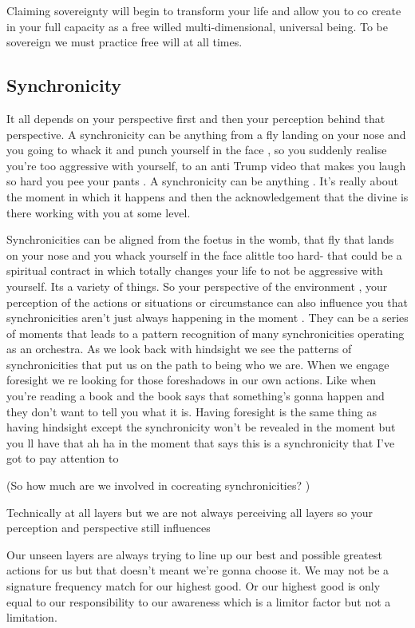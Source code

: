 Claiming sovereignty will begin to transform your life and allow you to
co create in your full capacity as a free willed multi-dimensional,
universal being. To be sovereign we must practice free will at all
times.

\subsection{Synchronicity}\label{synchronicity}

It all depends on your perspective first and then your perception behind
that perspective. A synchronicity can be anything from a fly landing on
your nose and you going to whack it and punch yourself in the face , so
you suddenly realise you're too aggressive with yourself, to an anti
Trump video that makes you laugh so hard you pee your pants . A
synchronicity can be anything . It's really about the moment in which it
happens and then the acknowledgement that the divine is there working
with you at some level.

Synchronicities can be aligned from the foetus in the womb, that fly
that lands on your nose and you whack yourself in the face alittle too
hard- that could be a spiritual contract in which totally changes your
life to not be aggressive with yourself. Its a variety of things. So
your perspective of the environment , your perception of the actions or
situations or circumstance can also influence you that synchronicities
aren't just always happening in the moment . They can be a series of
moments that leads to a pattern recognition of many synchronicities
operating as an orchestra. As we look back with hindsight we see the
patterns of synchronicities that put us on the path to being who we are.
When we engage foresight we re looking for those foreshadows in our own
actions. Like when you're reading a book and the book says that
something's gonna happen and they don't want to tell you what it is.
Having foresight is the same thing as having hindsight except the
synchronicity won't be revealed in the moment but you ll have that ah ha
in the moment that says this is a synchronicity that I've got to pay
attention to

(So how much are we involved in cocreating synchronicities? )

Technically at all layers but we are not always perceiving all layers so
your perception and perspective still influences

Our unseen layers are always trying to line up our best and possible
greatest actions for us but that doesn't meant we're gonna choose it. We
may not be a signature frequency match for our highest good. Or our
highest good is only equal to our responsibility to our awareness which
is a limitor factor but not a limitation.


